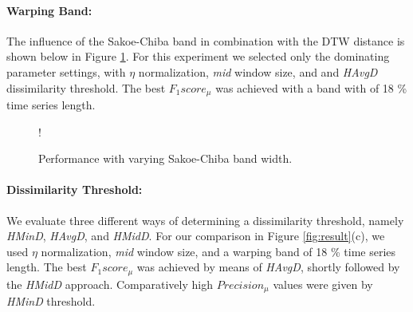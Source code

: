 \paragraph{Warping Band:}

The influence of the Sakoe-Chiba band in combination with the DTW distance is shown below in Figure \ref{fig:sakoe-chiba_band_result}.
For this experiment we selected only the dominating parameter settings, with $\eta$ normalization, \textit{mid} window size, and and \textit{HAvgD} dissimilarity threshold. The best $F_{1}score_{\mu}$ was achieved with a band with of 18 \% time series length.

\begin{figure}
    \begin{minipage}{0.55\textwidth}
        \resizebox {\textwidth} {!} {
        }
    \end{minipage}\hfill
    \begin{minipage}{0.4\textwidth}
        \caption{Performance with varying Sakoe-Chiba band width.}
        \label{fig:sakoe-chiba_band_result}
    \end{minipage}
\end{figure}


\paragraph{Dissimilarity Threshold:}

We evaluate three different ways of determining a dissimilarity threshold, namely \textit{HMinD}, \textit{HAvgD}, and \textit{HMidD}. For our comparison in Figure \ref{fig:result}(c), we used $\eta$ normalization, \textit{mid} window size, and a warping band of 18 \% time series length. The best $F_{1}score_{\mu}$ was achieved by means of \textit{HAvgD}, shortly followed by the \textit{HMidD} approach. Comparatively high $Precision_{\mu}$ values were given by \textit{HMinD} threshold.


